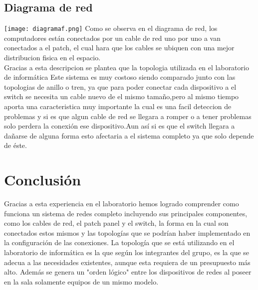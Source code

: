 \documentclass{udpreport}
\begin{document}
	\section{Diagrama de red}
		\texttt{[image: diagramaf.png]}
		Como se observa en el diagrama de red, los computadores están conectados por un cable de red uno por uno 
		a van conectados a el patch, el cual hara que los cables se ubiquen con una mejor distribucion fisica 
		en el espacio.\\
		Gracias a esta descripcion se plantea que la topologia utilizada en el laboratorio de informática
		Este sistema es muy costoso siendo comparado junto con las topologias de anillo o tren, ya que para poder
		conectar cada dispositivo a el switch se necesita un cable nuevo de el mismo tamaño,pero al mismo tiempo
		aporta una caracteristica muy importante la cual es una facil deteccion de problemas y si es que algun
		cable de red se llegara a romper o a tener problemas solo perdera la conexión  ese dispositivo.Aun así 
		si es que el switch llegara a dañarse de alguna forma esto afectaria a el sistema completo ya que solo
		depende de éste.
\chapter{Conclusión}
                Gracias a esta experiencia en el laboratorio hemos logrado comprender como funciona un sistema de redes completo 
                incluyendo sus principales componentes, como los cables de red, el patch panel y el switch, la forma en la cual son 
                conectados estos mismos y las topologías que se podrían haber implementado en la configuración de las conexiones. La 
                topología que se está utilizando en el laboratorio de informática es la que según los integrantes del grupo, es la que
                se adecua a las necesidades existentes, aunque esta requiera de un presupuesto más alto. Además se genera un "orden 
                lógico" entre los dispositivos de redes al poseer en la sala solamente equipos de un mismo modelo.
\end{document}
